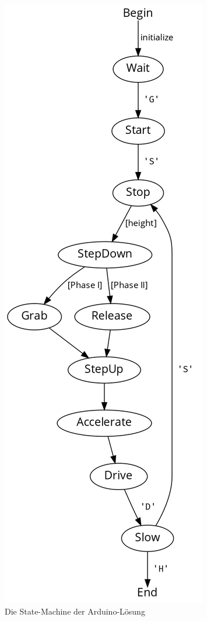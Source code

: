 \begin{figure}
    \centering
    \includegraphics[height=\textheight]{graphs/arduino-statemachine.png}
    \caption{Die State-Machine der Arduino-Lösung}
    \label{fig:arduino-statemachine}
\end{figure}

